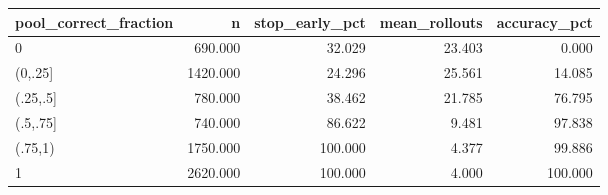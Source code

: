 \begin{tabular}{lrrrr}
\toprule
pool\_correct\_fraction & n & stop\_early\_pct & mean\_rollouts & accuracy\_pct \\
\midrule
0 & 690.000 & 32.029 & 23.403 & 0.000 \\
(0,.25] & 1420.000 & 24.296 & 25.561 & 14.085 \\
(.25,.5] & 780.000 & 38.462 & 21.785 & 76.795 \\
(.5,.75] & 740.000 & 86.622 & 9.481 & 97.838 \\
(.75,1) & 1750.000 & 100.000 & 4.377 & 99.886 \\
1 & 2620.000 & 100.000 & 4.000 & 100.000 \\
\bottomrule
\end{tabular}
